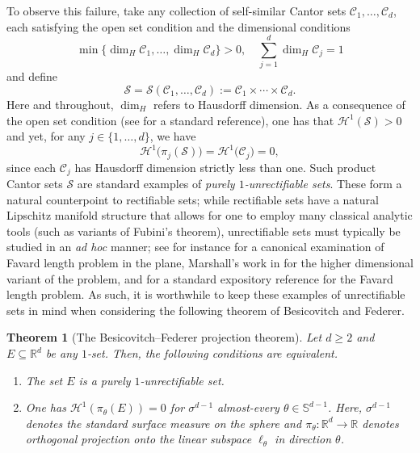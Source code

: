 \documentclass[12pt]{amsart}
\newtheorem{theorem}{Theorem}[section]
\theoremstyle{definition}
\numberwithin{equation}{section}
\newcommand{\R}{\mathbb{R}}
\begin{document}
To observe this failure, take any collection of self-similar Cantor sets $\mathcal{C}_1,\ldots,\mathcal{C}_d$, each satisfying the open set condition and the dimensional conditions
$$
\min \{\dim_H \mathcal{C}_1,\ldots,\dim_H \mathcal{C}_d \} > 0, \quad \sum\limits_{j = 1}^{d} \dim_H \mathcal{C}_j = 1
$$
and define
$$
\mathcal{S}=\mathcal{S}(\mathcal{C}_1,\ldots,\mathcal{C}_d) := \mathcal{C}_1 \times \cdots \times \mathcal{C}_d.
$$
Here and throughout, $\dim_H$ refers to Hausdorff dimension. As a consequence of the open set condition (see \cite[Chapter 4.13]{Mattila1995} for a standard reference), one has that $\mathcal{H}^1 (\mathcal{S}) > 0
$
and yet, for any $j \in \{1,\ldots,d\}$, we have
$$
\mathcal{H}^1 \big(\pi_{j} (\mathcal{S})\big) = \mathcal{H}^1 \big(\mathcal{C}_{j} \big) = 0,
$$
since each $\mathcal{C}_j$ has Hausdorff dimension strictly less than one. Such product Cantor sets $\mathcal{S}$ are standard examples of \emph{purely $1$-unrectifiable sets}. These form a natural counterpoint to rectifiable sets; while rectifiable sets have a natural Lipschitz manifold structure that allows for one to employ many classical analytic tools (such as variants of Fubini's theorem), unrectifiable sets must typically be studied in an \emph{ad hoc} manner; see for instance \cite{NPV2010} for a canonical examination of Favard length problem in the plane, Marshall's work in \cite{Marshall2025} for the higher dimensional variant of the problem, and \cite{Laba2015} for a standard expository reference for the Favard length problem. As such, it is worthwhile to keep these examples of unrectifiable sets in mind when considering the following theorem of Besicovitch and Federer.

\begin{theorem}[The Besicovitch--Federer projection theorem]\label{thm:besifed}
Let $d \geq 2$ and $E \subseteq \mathbb{R}^d$ be any $1$-set. Then, the following conditions are equivalent.
\begin{enumerate}
    \item The set $E$ is a purely $1$-unrectifiable set.
    \smallskip
    \item One has $\mathcal{H}^1 (\pi_{\theta} (E)) =0$ for $\sigma^{d-1}$ almost-every $\theta \in \mathbb{S}^{d-1}$. Here, $\sigma^{d-1}$ denotes the standard surface measure on the sphere and $\pi_\theta : \R^d \to \R$ denotes orthogonal projection onto the linear subspace $\ell_\theta$ in direction $\theta$.
\end{enumerate}
\end{theorem}
\end{document}
